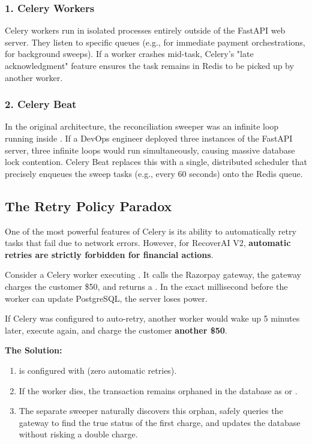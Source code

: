 \subsubsection{1. Celery Workers}
Celery workers run in isolated processes entirely outside of the FastAPI web server. They listen to specific queues (e.g.,  for immediate payment orchestrations,  for background sweeps). If a worker crashes mid-task, Celery's "late acknowledgment" feature ensures the task remains in Redis to be picked up by another worker.

\subsubsection{2. Celery Beat}
In the original architecture, the reconciliation sweeper was an infinite  loop running inside . If a DevOps engineer deployed three instances of the FastAPI server, three infinite loops would run simultaneously, causing massive database lock contention.
Celery Beat replaces this with a single, distributed scheduler that precisely enqueues the sweep tasks (e.g., every 60 seconds) onto the Redis queue.

\vspace{0.8cm}

\subsection{The Retry Policy Paradox}

One of the most powerful features of Celery is its ability to automatically retry tasks that fail due to network errors. However, for RecoverAI V2, \textbf{automatic retries are strictly forbidden for financial actions}.

\begin{tcolorbox}[warningbox={Why Financial Tasks Do Not Auto-Retry}]
Consider a Celery worker executing . It calls the Razorpay gateway, the gateway charges the customer \$50, and returns a . In the exact millisecond before the worker can update PostgreSQL, the server loses power.

If Celery was configured to auto-retry, another worker would wake up 5 minutes later, execute  again, and charge the customer \textbf{another \$50}.
\end{tcolorbox}

\textbf{The Solution:} 
\begin{enumerate}
    \item {} is configured with  (zero automatic retries).
    \item If the worker dies, the transaction remains orphaned in the database as  or .
    \item The separate  sweeper naturally discovers this orphan, safely queries the gateway to find the true status of the first charge, and updates the database without risking a double charge.
\end{enumerate}

